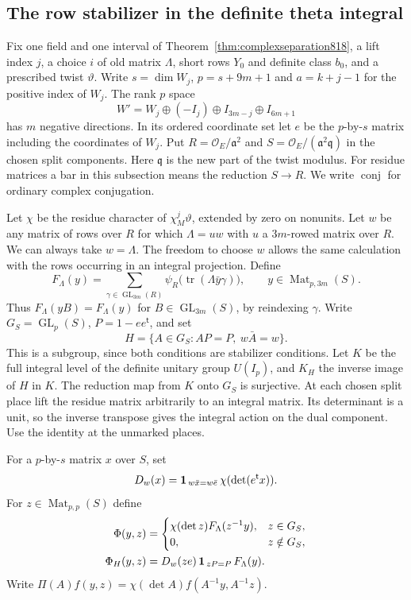 \documentclass[a4paper,11pt]{article}
\theoremstyle{definition}
\theoremstyle{remark}
\numberwithin{equation}{section}
\newcommand{\OO}{\mathcal O}
\begin{document}
\subsection{The row stabilizer in the definite theta integral}
\label{sec:refinedclass824}
Fix one field and one interval of Theorem~\ref{thm:complexseparation818},
a lift index \(j\), a choice \(i\) of old matrix \(\Lambda\),
short rows \(Y_0\) and definite class \(b_0\), and a prescribed
twist \(\vartheta\). Write \(s=\dim W_j\), \(p=s+9m+1\) and
\(a=k+j-1\) for the positive index of \(W_j\).
The rank \(p\) space
\[
 W'=W_j\oplus(-I_j)\oplus I_{3m-j}\oplus I_{6m+1}
\]
has \(m\) negative directions. In its ordered coordinate set
let \(e\) be the \(p\)-by-\(s\) matrix including the coordinates
of \(W_j\). Put \(R=\OO_E/\mathfrak a^2\) and
\(S=\OO_E/(\mathfrak a^2\mathfrak q)\) in the chosen split
components. Here \(\mathfrak q\) is the new part of the twist
modulus. For residue matrices a bar in this subsection means
the reduction \(S\longrightarrow R\). We write
\(\operatorname{conj}\) for ordinary complex conjugation.

Let \(\chi\) be the residue character of \(\chi_M^j\vartheta\),
extended by zero on nonunits. Let \(w\) be any matrix of rows
over \(R\) for which \(\Lambda=u w\) with \(u\) a
\(3m\)-rowed matrix over \(R\). We can always take \(w=\Lambda\).
The freedom to choose \(w\) allows the same calculation with
the rows occurring in an integral projection. Define
\[
 F_\Lambda(y)=\sum_{\gamma\in\operatorname{GL}_{3m}(R)}
       \psi_R\bigl(\operatorname{tr}(\Lambda\bar y\gamma)\bigr),
 \qquad y\in\operatorname{Mat}_{p,3m}(S).
\]
Thus \(F_\Lambda(yB)=F_\Lambda(y)\) for
\(B\in\operatorname{GL}_{3m}(S)\), by reindexing \(\gamma\).
Write \(G_S=\operatorname{GL}_p(S)\), \(P=1-ee^{\mathsf t}\), and set
\[
 H=\{A\in G_S: AP=P,\ w\bar A=w\}.
\]
This is a subgroup, since both conditions are stabilizer conditions.
Let \(K\) be the full integral level of the definite unitary group
\(U(I_p)\), and \(K_H\) the inverse image of \(H\) in \(K\).
The reduction map from \(K\) onto \(G_S\) is surjective. At each
chosen split place lift the residue matrix arbitrarily to an
integral matrix. Its determinant is a unit, so the inverse
transpose gives the integral action on the dual component. Use
the identity at the unmarked places.

For a \(p\)-by-\(s\) matrix \(x\) over \(S\), set
\[
 D_w(x)={\bf1}_{\,w\bar x=w\bar e}\,\chi(\det(e^{\mathsf t}x)).
\]
For \(z\in\operatorname{Mat}_{p,p}(S)\) define
\[
 \begin{split}
 \Phi(y,z)&=\begin{cases}
       \chi(\det z)F_\Lambda(z^{-1}y),&z\in G_S,\\
       0,&z\notin G_S,
                 \end{cases}\\
 \Phi_H(y,z)&=D_w(ze)\,{\bf1}_{\,zP=P}\,F_\Lambda(y).
 \end{split}
\]
Write \(\Pi(A)f(y,z)=\chi(\det A)f(A^{-1}y,A^{-1}z)\).
\end{document}
